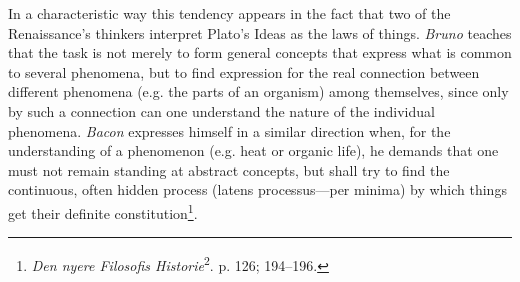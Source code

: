 \documentclass[12pt,a4paper]{book}
\begin{document}
In a characteristic way this tendency appears in the fact that two of the
Renaissance's thinkers interpret Plato's Ideas as the laws of things.
\emph{Bruno} teaches that the task is not merely to form general concepts
that express what is common to several phenomena, but to find expression
for the real connection between different phenomena (e.g. the parts of an
organism) among themselves, since only by such a connection can one
understand the nature of the individual phenomena. \emph{Bacon} expresses
himself in a similar direction when, for the understanding of a phenomenon
(e.g. heat or organic life), he demands that one must not remain standing at
abstract concepts, but shall try to find the continuous, often hidden
process (latens processus---per minima) by which things get their definite
constitution\footnote{\emph{Den nyere Filosofis
Historie}\textsuperscript{2}. p. 126; 194--196.}.
\end{document}
